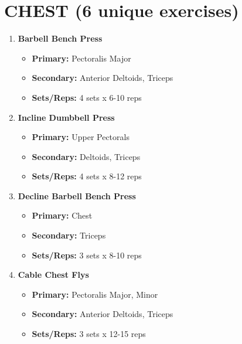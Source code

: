 \documentclass{article}
\begin{document}
\section*{CHEST (6 unique exercises)}
\begin{enumerate}[label=\arabic*., wide=0pt, leftmargin=*]
    \item \textbf{Barbell Bench Press}
        \begin{itemize}[label=\textbullet, leftmargin=*, nosep, topsep=0pt, partopsep=0pt]
            \item \textbf{Primary:} Pectoralis Major
            \item \textbf{Secondary:} Anterior Deltoids, Triceps
            \item \textbf{Sets/Reps:} 4 sets x 6-10 reps
        \end{itemize}

    \item \textbf{Incline Dumbbell Press}
        \begin{itemize}[label=\textbullet, leftmargin=*, nosep, topsep=0pt, partopsep=0pt]
            \item \textbf{Primary:} Upper Pectorals
            \item \textbf{Secondary:} Deltoids, Triceps
            \item \textbf{Sets/Reps:} 4 sets x 8-12 reps
        \end{itemize}

    \item \textbf{Decline Barbell Bench Press}
        \begin{itemize}[label=\textbullet, leftmargin=*, nosep, topsep=0pt, partopsep=0pt]
            \item \textbf{Primary:} Chest
            \item \textbf{Secondary:} Triceps
            \item \textbf{Sets/Reps:} 3 sets x 8-10 reps
        \end{itemize}

    \item \textbf{Cable Chest Flys}
        \begin{itemize}[label=\textbullet, leftmargin=*, nosep, topsep=0pt, partopsep=0pt]
            \item \textbf{Primary:} Pectoralis Major, Minor
            \item \textbf{Secondary:} Anterior Deltoids, Triceps
            \item \textbf{Sets/Reps:} 3 sets x 12-15 reps
        \end{itemize}


\end{enumerate}
\end{document}
